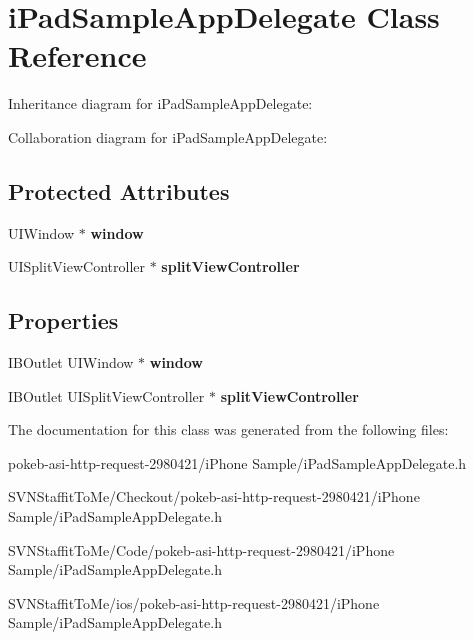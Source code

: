\hypertarget{interfacei_pad_sample_app_delegate}{
\section{i\-Pad\-Sample\-App\-Delegate \-Class \-Reference}
\label{interfacei_pad_sample_app_delegate}
}


\-Inheritance diagram for i\-Pad\-Sample\-App\-Delegate\-:


\-Collaboration diagram for i\-Pad\-Sample\-App\-Delegate\-:
\subsection*{\-Protected \-Attributes}
\begin{DoxyCompactItemize}
\item 
\hypertarget{interfacei_pad_sample_app_delegate_a9f9de186cbbe136986ee9bad0373fc10}{
\-U\-I\-Window $\ast$ {\bfseries window}}
\label{interfacei_pad_sample_app_delegate_a9f9de186cbbe136986ee9bad0373fc10}

\item 
\hypertarget{interfacei_pad_sample_app_delegate_ad485cfff3ad1a2f03495070dc0d21a26}{
\-U\-I\-Split\-View\-Controller $\ast$ {\bfseries split\-View\-Controller}}
\label{interfacei_pad_sample_app_delegate_ad485cfff3ad1a2f03495070dc0d21a26}

\end{DoxyCompactItemize}
\subsection*{\-Properties}
\begin{DoxyCompactItemize}
\item 
\hypertarget{interfacei_pad_sample_app_delegate_a644acb04753e51b5b18f48e8e81e115c}{
\-I\-B\-Outlet \-U\-I\-Window $\ast$ {\bfseries window}}
\label{interfacei_pad_sample_app_delegate_a644acb04753e51b5b18f48e8e81e115c}

\item 
\hypertarget{interfacei_pad_sample_app_delegate_a5bdfbd9f03655d35b0c72d9d724af92d}{
\-I\-B\-Outlet \-U\-I\-Split\-View\-Controller $\ast$ {\bfseries split\-View\-Controller}}
\label{interfacei_pad_sample_app_delegate_a5bdfbd9f03655d35b0c72d9d724af92d}

\end{DoxyCompactItemize}


\-The documentation for this class was generated from the following files\-:\begin{DoxyCompactItemize}
\item 
pokeb-\/asi-\/http-\/request-\/2980421/i\-Phone Sample/i\-Pad\-Sample\-App\-Delegate.\-h\item 
\-S\-V\-N\-Staffit\-To\-Me/\-Checkout/pokeb-\/asi-\/http-\/request-\/2980421/i\-Phone Sample/i\-Pad\-Sample\-App\-Delegate.\-h\item 
\-S\-V\-N\-Staffit\-To\-Me/\-Code/pokeb-\/asi-\/http-\/request-\/2980421/i\-Phone Sample/i\-Pad\-Sample\-App\-Delegate.\-h\item 
\-S\-V\-N\-Staffit\-To\-Me/ios/pokeb-\/asi-\/http-\/request-\/2980421/i\-Phone Sample/i\-Pad\-Sample\-App\-Delegate.\-h\end{DoxyCompactItemize}
